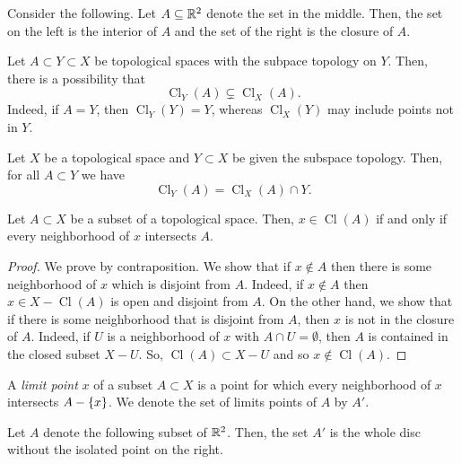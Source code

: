 \documentclass[12pt]{book} %
\DeclareMathOperator{\Cl}{Cl}
\begin{document}
\begin{example}
Consider the following.
Let \( A \subseteq \mathbb{R}^2 \) denote the set in the middle.
Then, the set on the left is the interior of \( A \) and the set of the right is the closure of \( A \).
\end{example}

\begin{remark}
Let \( A \subset Y \subset X \) be topological spaces with the subpace topology on \( Y \).
Then, there is a possibility that
\[ \Cl_Y(A) \subsetneq \Cl_X(A). \]
Indeed, if \( A = Y \), then \( \Cl_Y(Y) = Y \), whereas \( \Cl_X(Y) \) may include points not in \( Y \).
\end{remark}

\begin{theorem}
Let \( X \) be a topological space and \( Y \subset X \) be given the subspace topology.
Then, for all \( A \subset Y \) we have
\[ \Cl_Y(A) = \Cl_X(A) \cap Y. \]
\end{theorem}

\begin{theorem}
Let \( A \subset X \) be a subset of a topological space.
Then, \( x \in \Cl(A) \) if and only if every neighborhood of \( x \) intersects \( A \).
\end{theorem}

\begin{proof}
We prove by contraposition.
We show that if \( x \not \in A \) then there is some neighborhood of \( x \) which is disjoint from \( A \).
Indeed, if \( x \not \in A \) then \( x \in X - \Cl(A) \) is open and disjoint from \( A \).
On the other hand, we show that if there is some neighborhood that is disjoint from \( A \), then \( x \) is not in the closure of \( A \).
Indeed, if \( U \) is a neighborhood of \( x \) with \( A \cap U = \emptyset \), then \( A \) is contained in the closed subset \( X - U \). So, \( \Cl(A) \subset X - U \) and so \( x \not \in \Cl(A) \).
\end{proof}

\begin{definition}
A \emph{limit point} \( x \) of a subset \( A \subset X \) is a point for which every neighborhood of \( x \) intersects \( A - \{x\} \).
We denote the set of limits points of \( A \) by \( A' \).
\end{definition}

\begin{example}
Let \( A \) denote the following subset of \( \mathbb{R}^2 \).
Then, the set \( A' \) is the whole disc without the isolated point on the right.
\end{example}
\end{document}

